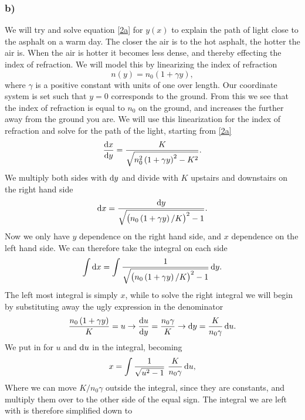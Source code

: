 \documentclass[12pt,twoside]{article}
\begin{document}
\subsubsection*{b)}
We will try and solve equation \eqref{2a} for $y(x)$ to explain the path of light close to the asphalt on a warm day. The closer the air is to the hot asphalt, the hotter the air is. When the air is hotter it becomes less dense, and thereby effecting the index of refraction. We will model this by linearizing the index of refraction
\begin{equation}
  n\left(y\right) = n_0\left(1+\gamma y\right),
\end{equation}
where $\gamma$ is a positive constant with units of one over length. Our coordinate system is set such that $y=0$ corresponds to the ground. From this we see that the index of refraction is equal to $n_0$ on the ground, and increases the further away from the ground you are. We will use this linearization for the index of refraction and solve for the path of the light, starting from \eqref{2a}
\begin{equation}
   \frac{\dif x}{\dif y} = \frac{K}{\sqrt{n_0^2\left(1+\gamma y\right)^2-K^2}}.
\end{equation}
We multiply both sides with $\dif y$ and divide with $K$ upstairs and downstairs on the right hand side
\begin{equation}
   \dif x = \frac{\dif y}{\sqrt{\left(n_0\left(1+\gamma y\right)/K\right)^2-1}}.
\end{equation}
Now we only have $y$ dependence on the right hand side, and $x$ dependence on the left hand side. We can therefore take the integral on each side
\begin{equation}
   \int \dif x = \int \frac{1}{\sqrt{\left(n_0\left(1+\gamma y\right)/K\right)^2-1}} \dif y.
\end{equation}
The left most integral is simply $x$, while to solve the right integral we will begin by substituting away the ugly expression in the denominator
\begin{equation}
  \frac{n_0\left(1+\gamma y\right)}{K} = u \rightarrow \frac{\dif u}{\dif y} = \frac{n_0\gamma}{K} \rightarrow \dif y = \frac{K}{n_0\gamma} \dif u. \label{u}
\end{equation}
We put in for $u$ and $\dif u$ in the integral, becoming
\begin{equation}
   x = \int \frac{1}{\sqrt{u^2-1}} \,\,\frac{K}{n_0\gamma} \dif u,
\end{equation}
Where we can move $K/n_0\gamma$ outside the integral, since they are constants, and multiply them over to the other side of the equal sign. The integral we are left with is therefore simplified down to
\end{document}
